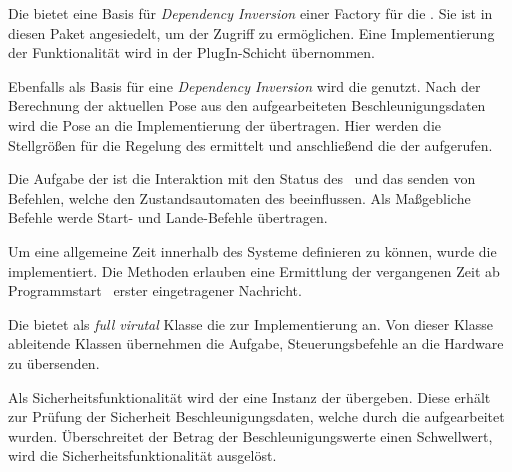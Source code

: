 Die  bietet eine Basis für \textit{Dependency Inversion} einer Factory für die . Sie ist in diesen Paket angesiedelt, um der  Zugriff zu ermöglichen. Eine Implementierung der Funktionalität wird in der PlugIn-Schicht übernommen.


Ebenfalls als Basis für eine \textit{Dependency Inversion} wird die  genutzt. Nach der Berechnung der aktuellen Pose aus den aufgearbeiteten Beschleunigungsdaten wird die Pose an die Implementierung der  übertragen. Hier werden die Stellgrößen für die Regelung des \Quad[s] ermittelt und anschließend die  der  aufgerufen.


Die Aufgabe der  ist die Interaktion mit den Status des \Quad\ und das senden von Befehlen, welche den Zustandsautomaten des \Quad[s] beeinflussen. Als Maßgebliche Befehle werde Start- und Lande-Befehle übertragen.


Um eine allgemeine Zeit innerhalb des Systeme definieren zu können, wurde die  implementiert. Die Methoden erlauben eine Ermittlung der vergangenen Zeit ab Programmstart \bzw\ erster eingetragener Nachricht.\\


Die  bietet als \textit{full virutal} Klasse die  zur Implementierung an. Von dieser Klasse ableitende Klassen übernehmen die Aufgabe, Steuerungsbefehle an die Hardware zu übersenden.


Als Sicherheitsfunktionalität wird der  eine Instanz der  übergeben. Diese erhält zur Prüfung der Sicherheit Beschleunigungsdaten, welche durch die  aufgearbeitet wurden. Überschreitet der Betrag der Beschleunigungswerte einen Schwellwert, wird die Sicherheitsfunktionalität ausgelöst.\\


